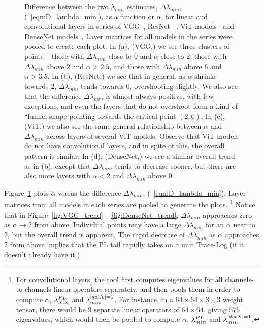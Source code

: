 \begin{figure}[t]
{      \label{fig:DenseNet_trend}
    }
    \caption{Difference between the two $\lambda_{min}$ estimates, $\Delta\lambda_{min}$, (\EQN~\ref{eqn:D_lambda_min}), as a 
        function or $\alpha$, for linear and convolutional layers in series of VGG~\cite{VGG14_TR}, ResNet~ 
        \cite{ResNet15_TR}, ViT models~\cite{VIT20_TR} and DenseNet models~\cite{DenseNet17_TR}. Layer matrices for all 
        models in the series were pooled to create each plot. In (a), (VGG,) we see three clusters of points -- those 
        with $\Delta \lambda_{min}$ close to $0$ and $\alpha$ close to $2$, those with $\Delta \lambda_{min}$ above $2$ 
        and $\alpha > 2.5$, and those with $\Delta \lambda_{min}$ above $6$ and $\alpha > 3.5$. In (b), (ResNet,) we see 
        that in general, as $\alpha$ shrinks towards $2$, $\Delta \lambda_{min}$ tends towards $0$, overshooting 
        slightly. We also see that the difference $\Delta\lambda_{min}$ is almost always positive, with few exceptions, 
        and even the layers that do not overshoot form a kind of ``funnel shape pointing towards the critical point 
        $(2, 0)$. In (c), (ViT,) we also see the same general relationship between $\alpha$ and $\Delta \lambda_{min}$ 
        across layers of several ViT models. Observe that ViT models do not have convolutional layers, and in spite of 
        this, the overall pattern is similar. In (d), (DenseNet,) we see a similar overall trend as in (b), except that 
        $\Delta\lambda_{min}$ tends to decrease sooner, but there are also more layers with $\alpha < 2$ and 
        $\Delta\lambda_{min}$ above $0$.
    }
  \label{fig:CV_ESD_trends}
\end{figure}


Figure~\ref{fig:CV_ESD_trends} plots $\alpha$ versus the difference $\Delta\lambda_{min}$, (\EQN~\ref{eqn:D_lambda_min}).
Layer matrices from all models in each series are pooled to generate the plots.%
\footnote{For convolutional layers, the \WW tool first computes eigenvalues for all channels-to-channels linear operators separately, and then pools them in order to compute $\alpha$, $\lambda^{PL}_{min}$ and $\lambda^{\vert detX\vert=1}_{min}$. For instance, in a $64\times 64\times 3\times 3$ weight tensor, there would be $9$ separate linear operators of $64\times 64$, giving $576$ eigenvalues, which would then be pooled to compute $\alpha$, $\lambda^{PL}_{min}$ and $\lambda^{\vert detX\vert=1}_{min}$.} 
Notice that in Figure~\ref{fig:VGG_trend} -- \ref{fig:DenseNet_trend}, $\Delta\lambda_{min}$ approaches zero as $\alpha\rightarrow 2$ from above. 
Individual points may have a large $\Delta\lambda_{min}$ for an $\alpha$ near to $2$, but the overall trend is apparent. 
The rapid decrease of $\Delta\lambda_{min}$ as $\alpha$ approaches $2$ from above implies that the PL tail rapidly 
takes on a unit Trace-Log (if it doesn't already have it.)

